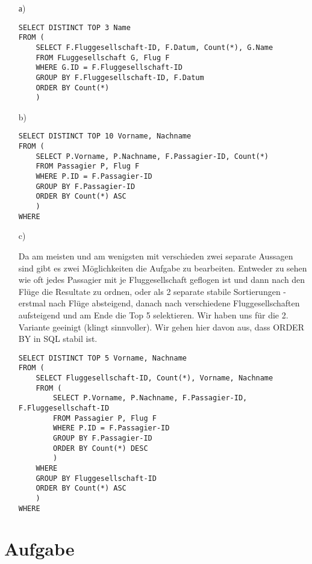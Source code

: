 \begin{itemize}

\item[а)]
\begin{Verbatim}
SELECT DISTINCT TOP 3 Name
FROM (
	SELECT F.Fluggesellschaft-ID, F.Datum, Count(*), G.Name
	FROM FLuggesellschaft G, Flug F
	WHERE G.ID = F.Fluggesellschaft-ID
	GROUP BY F.Fluggesellschaft-ID, F.Datum
	ORDER BY Count(*)
	)
\end{Verbatim}

\item[b)]
\begin{Verbatim}
SELECT DISTINCT TOP 10 Vorname, Nachname
FROM (
	SELECT P.Vorname, P.Nachname, F.Passagier-ID, Count(*)
	FROM Passagier P, Flug F
	WHERE P.ID = F.Passagier-ID
	GROUP BY F.Passagier-ID
	ORDER BY Count(*) ASC
	)
WHERE
\end{Verbatim}

\item[c)]

Da am meisten und am wenigsten mit verschieden zwei separate Aussagen sind gibt es zwei Möglichkeiten die Aufgabe zu bearbeiten. Entweder zu sehen wie oft jedes Passagier mit je Fluggesellschaft geflogen ist und dann nach den Flüge die Resultate zu ordnen, oder als 2 separate stabile Sortierungen - erstmal nach Flüge absteigend, danach nach verschiedene Fluggesellschaften aufsteigend und am Ende die Top 5 selektieren. Wir haben uns für die 2. Variante geeinigt (klingt sinnvoller). Wir gehen hier davon aus, dass ORDER BY in SQL stabil ist.

\begin{Verbatim}
SELECT DISTINCT TOP 5 Vorname, Nachname
FROM (
	SELECT Fluggesellschaft-ID, Count(*), Vorname, Nachname
	FROM (
		SELECT P.Vorname, P.Nachname, F.Passagier-ID, F.Fluggesellschaft-ID
		FROM Passagier P, Flug F
		WHERE P.ID = F.Passagier-ID
		GROUP BY F.Passagier-ID
		ORDER BY Count(*) DESC
		)
	WHERE
	GROUP BY Fluggesellschaft-ID
	ORDER BY Count(*) ASC
	)
WHERE
\end{Verbatim}


\end{itemize}

\section{Aufgabe}

